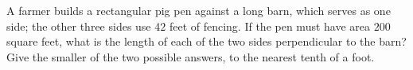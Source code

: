 A farmer builds a rectangular pig pen against a long barn, which serves as one side; the other three sides use $42$ feet of fencing. If the pen must have area $200$ square feet, what is the length of each of the two sides perpendicular to the barn? Give the smaller of the two possible answers, to the nearest tenth of a foot.
